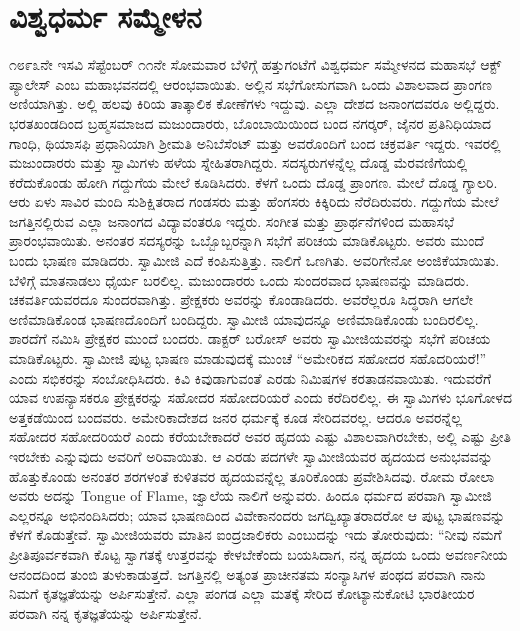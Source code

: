 
\chapter{ವಿಶ್ವಧರ್ಮ ಸಮ್ಮೇಳನ}

೧೮೯೩ನೇ ಇಸವಿ ಸೆಪ್ಟೆಂಬರ್ ೧೧ನೇ ಸೋಮವಾರ ಬೆಳಿಗ್ಗೆ ಹತ್ತುಗಂಟೆಗೆ ವಿಶ್ವಧರ್ಮ ಸಮ್ಮೇಳನದ ಮಹಾಸಭೆ ಆಕ್ಟ್ ಪ್ಯಾಲೇಸ್ ಎಂಬ ಮಹಾಭವನದಲ್ಲಿ ಆರಂಭವಾಯಿತು. ಅಲ್ಲಿನ ಸಭೆಗೋಸುಗವಾಗಿ ಒಂದು ವಿಶಾಲವಾದ ಪ್ರಾಂಗಣ ಅಣಿಯಾಗಿತ್ತು. ಅಲ್ಲಿ ಹಲವು ಕಿರಿಯ ತಾತ್ಕಾಲಿಕ ಕೋಣೆಗಳು ಇದ್ದುವು. ಎಲ್ಲಾ ದೇಶದ ಜನಾಂಗದವರೂ ಅಲ್ಲಿದ್ದರು. ಭರತಖಂಡದಿಂದ ಬ್ರಹ್ಮಸಮಾಜದ ಮಜುಂದಾರರು, ಬೊಂಬಾಯಿಯಿಂದ ಬಂದ ನಗರ್‍ಕರ್, ಜೈನರ ಪ್ರತಿನಿಧಿಯಾದ ಗಾಂಧಿ, ಥಿಯಾಸಫಿ ಪ್ರಧಾನಿಯಾಗಿ ಶ‍್ರೀಮತಿ ಅನಿಬೆಸೆಂಟ್ ಮತ್ತು ಅವರೊಂದಿಗೆ ಬಂದ ಚಕ್ರವರ್ತಿ ಇದ್ದರು. ಇವರಲ್ಲಿ ಮಜುಂದಾರರು ಮತ್ತು ಸ್ವಾಮಿಗಳು ಹಳೆಯ ಸ್ನೇಹಿತರಾಗಿದ್ದರು. ಸದಸ್ಯರುಗಳನ್ನೆಲ್ಲ ದೊಡ್ಡ ಮೆರವಣಿಗೆಯಲ್ಲಿ ಕರೆದುಕೊಂಡು ಹೋಗಿ ಗದ್ದುಗೆಯ ಮೇಲೆ ಕೂಡಿಸಿದರು. ಕೆಳಗೆ ಒಂದು ದೊಡ್ಡ ಪ್ರಾಂಗಣ. ಮೇಲೆ ದೊಡ್ಡ ಗ್ಯಾಲರಿ. ಆರು ಏಳು ಸಾವಿರ ಮಂದಿ ಸುಶಿಕ್ಷಿತರಾದ ಗಂಡಸರು ಮತ್ತು ಹೆಂಗಸರು ಕಿಕ್ಕಿರಿದು ನೆರೆದಿರುವರು. ಗದ್ದುಗೆಯ ಮೇಲೆ ಜಗತ್ತಿನಲ್ಲಿರುವ ಎಲ್ಲಾ ಜನಾಂಗದ ವಿದ್ಯಾವಂತರೂ ಇದ್ದರು. ಸಂಗೀತ ಮತ್ತು ಪ್ರಾರ್ಥನೆಗಳಿಂದ ಮಹಾಸಭೆ ಪ್ರಾರಂಭವಾಯಿತು. ಅನಂತರ ಸದಸ್ಯರನ್ನು ಒಬ್ಬೊಬ್ಬರನ್ನಾಗಿ ಸಭೆಗೆ ಪರಿಚಯ ಮಾಡಿಕೊಟ್ಟರು. ಅವರು ಮುಂದೆ ಬಂದು ಭಾಷಣ ಮಾಡಿದರು. ಸ್ವಾಮೀಜಿ ಎದೆ ಕಂಪಿಸುತ್ತಿತ್ತು. ನಾಲಿಗೆ ಒಣಗಿತು. ಅವರಿಗೇನೋ ಅಂಜಿಕೆಯಾಯಿತು. ಬೆಳಿಗ್ಗೆ ಮಾತನಾಡಲು ಧೈರ್ಯ ಬರಲಿಲ್ಲ. ಮಜುಂದಾರರು ಒಂದು ಸುಂದರವಾದ ಭಾಷಣವನ್ನು ಮಾಡಿದರು. ಚಕವರ್ತಿಯವರದೂ ಸುಂದರವಾಗಿತ್ತು. ಪ್ರೇಕ್ಷಕರು ಅವರನ್ನು ಕೊಂಡಾಡಿದರು. ಅವರೆಲ್ಲರೂ ಸಿದ್ಧರಾಗಿ ಆಗಲೇ ಅಣಿಮಾಡಿಕೊಂಡ ಭಾಷಣದೊಂದಿಗೆ ಬಂದಿದ್ದರು. ಸ್ವಾಮೀಜಿ ಯಾವುದನ್ನೂ ಅಣಿಮಾಡಿಕೊಂಡು ಬಂದಿರಲಿಲ್ಲ. ಶಾರದೆಗೆ ನಮಿಸಿ ಪ್ರೇಕ್ಷಕರ ಮುಂದೆ ಬಂದರು. ಡಾಕ್ಟರ್ ಬರೋಸ್ ಅವರು ಸ್ವಾಮೀಜಿಯವರನ್ನು ಸಭೆಗೆ ಪರಿಚಯ ಮಾಡಿಕೊಟ್ಟರು. ಸ್ವಾಮೀಜಿ ಪುಟ್ಟ ಭಾಷಣ ಮಾಡುವುದಕ್ಕೆ ಮುಂಚೆ “ಅಮೇರಿಕದ ಸಹೋದರ ಸಹೊದರಿಯರೆ!” ಎಂದು ಸಭಿಕರನ್ನು ಸಂಬೋಧಿಸಿದರು. ಕಿವಿ ಕಿವುಡಾಗುವಂತೆ ಎರಡು ನಿಮಿಷಗಳ ಕರತಾಡನವಾಯಿತು. ಇದುವರೆಗೆ ಯಾವ ಉಪನ್ಯಾಸಕರೂ ಪ್ರೇಕ್ಷಕರನ್ನು ಸಹೋದರ ಸಹೋದರಿಯರೆ ಎಂದು ಕರೆದಿರಲಿಲ್ಲ. ಈ ಸ್ವಾಮಿಗಳು ಭೂಗೋಳದ ಅತ್ತಕಡೆಯಿಂದ ಬಂದವರು. ಅಮೇರಿಕಾದೇಶದ ಜನರ ಧರ್ಮಕ್ಕೆ ಕೂಡ ಸೇರಿದವರಲ್ಲ. ಆದರೂ ಅವರನ್ನೆಲ್ಲ ಸಹೋದರ ಸಹೋದರಿಯರೆ ಎಂದು ಕರೆಯಬೇಕಾದರೆ ಅವರ ಹೃದಯ ಎಷ್ಟು ವಿಶಾಲವಾಗಿರಬೇಕು, ಅಲ್ಲಿ ಎಷ್ಟು ಪ್ರೀತಿ ಇರಬೇಕು ಎನ್ನುವುದು ಅವರಿಗೆ ಅರಿವಾಯಿತು. ಆ ಎರಡು ಪದಗಳೇ ಸ್ವಾಮೀಜಿಯವರ ಹೃದಯದ ಅನುಭವವನ್ನು ಹೊತ್ತುಕೊಂಡು ಅನಂತರ ಶರಗಳಂತೆ ಕುಳಿತವರ ಹೃದಯವನ್ನೆಲ್ಲ ತೂರಿಕೊಂಡು ಪ್ರವೇಶಿಸಿದವು. ರೋಮ ರೋಲಾ ಅವರು ಅದನ್ನು Tongue of Flame, ಜ್ವಾಲೆಯ ನಾಲಿಗೆ ಅನ್ನುವರು. ಹಿಂದೂ ಧರ್ಮದ ಪರವಾಗಿ ಸ್ವಾಮೀಜಿ ಎಲ್ಲರನ್ನೂ ಅಭಿನಂದಿಸಿದರು; ಯಾವ ಭಾಷಣದಿಂದ ವಿವೇಕಾನಂದರು ಜಗದ್ವಿಖ್ಯಾತರಾದರೋ ಆ ಪುಟ್ಟ ಭಾಷಣವನ್ನು ಕೆಳಗೆ ಕೊಡುತ್ತೇವೆ. ಸ್ವಾಮೀಜಿಯವರು ಮಾತಿನ ಐಂದ್ರಜಾಲಿಕರು ಎಂಬುದನ್ನು ಇದು ತೋರುವುದು: “ನೀವು ನಮಗೆ ಪ್ರೀತಿಪೂರ್ವಕವಾಗಿ ಕೊಟ್ಟ ಸ್ವಾಗತಕ್ಕೆ ಉತ್ತರವನ್ನು ಕೇಳಬೇಕೆಂದು ಬಯಸಿದಾಗ, ನನ್ನ ಹೃದಯ ಒಂದು ಅವರ್ಣನೀಯ ಆನಂದದಿಂದ ತುಂಬಿ ತುಳುಕಾಡುತ್ತದೆ. ಜಗತ್ತಿನಲ್ಲಿ ಅತ್ಯಂತ ಪ್ರಾಚೀನತಮ ಸಂನ್ಯಾಸಿಗಳ ಪಂಥದ ಪರವಾಗಿ ನಾನು ನಿಮಗೆ ಕೃತಜ್ಞತೆಯನ್ನು ಅರ್ಪಿಸುತ್ತೇನೆ. ಎಲ್ಲಾ ಪಂಗಡ ಎಲ್ಲಾ ಮತಕ್ಕೆ ಸೇರಿದ ಕೋಟ್ಯಾನುಕೋಟಿ ಭಾರತೀಯರ ಪರವಾಗಿ ನನ್ನ ಕೃತಜ್ಞತೆಯನ್ನು ಅರ್ಪಿಸುತ್ತೇನೆ.


